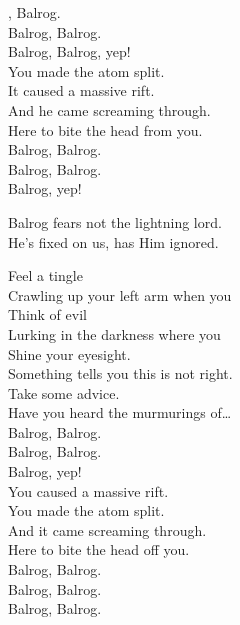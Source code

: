 



, Balrog. \\
Balrog, Balrog. \\
Balrog, Balrog, yep! \\

You made the atom split. \\
It caused a massive rift. \\
And he came screaming through. \\
Here to bite the head from you. \\

Balrog, Balrog. \\
Balrog, Balrog. \\
Balrog, yep! \\


Balrog fears not the lightning lord. \\
He's fixed on us, has Him ignored. \\


Feel a tingle \\
Crawling up your left arm when you \\
Think of evil \\
Lurking in the darkness where you \\
Shine your eyesight. \\
Something tells you this is not right. \\
Take some advice. \\
Have you heard the murmurings of… \\

Balrog, Balrog. \\
Balrog, Balrog. \\
Balrog, yep! \\

You caused a massive rift. \\
You made the atom split. \\
And it came screaming through. \\
Here to bite the head off you. \\

Balrog, Balrog. \\
Balrog, Balrog. \\
Balrog, Balrog. \\

